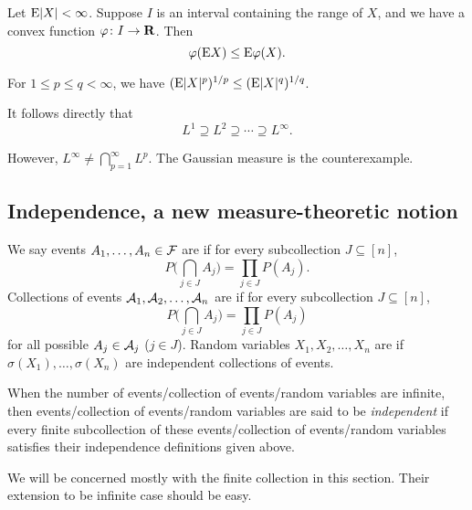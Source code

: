\begin{namedthm} \label{thm:Jensen-prob}
    Let $\mathop{}\!\mathrm{E}\lvert X \rvert <\infty$. Suppose $I$ is an interval containing the range of $X$, and we have a convex function $\varphi\colon I\to \mathbf{R}$. Then \[
        \varphi(\mathop{}\!\mathrm{E} X) \leq \mathop{}\!\mathrm{E} \varphi(X).
    \]
\end{namedthm}
    
\begin{namedthm}
For $1 \leq p \leq q <\infty $, we have $(\mathop{}\!\mathrm{E}\lvert X \rvert^p)^{1/p} \leq (\mathop{}\!\mathrm{E} \lvert X \rvert^q)^{1/q}$.

It follows directly that \[L^1 \supseteq L^2 \supseteq \dotsb \supseteq L^\infty.\]
\end{namedthm}

However, $L^\infty \neq \bigcap_{p=1}^\infty L^p$. The Gaussian measure is the counterexample.

\subsection{Independence, a new measure-theoretic notion}

\begin{defn}
    We say events $A_1,\dotsc,A_n \in \mathcal{F}$ are  if for every subcollection $J \subseteq [n]$, \[
    P\biggl(\bigcap_{j\in J} A_j\biggr) = \prod_{j\in J} P(A_j).
\] %
Collections of events $\mathcal{A}_1,\mathcal{A}_2,\dotsc,\mathcal{A}_n$ are  if for every subcollection $J \subseteq [n]$, \[
    P\biggl(\bigcap_{j \in J} A_j\biggr) = \prod_{j\in J}P(A_j)
\] for all possible $A_j \in \mathcal{A}_j$ ($j \in J$).
Random variables $X_1,X_2,\dotsc,X_n$ are  if $\sigma(X_1),\dotsc,\sigma(X_n)$ are independent collections of events.

When the number of events/collection of events/random variables are infinite, then events/collection of events/random variables are said to be \emph{independent} if every finite subcollection of these events/collection of events/random variables satisfies their independence definitions given above.
\end{defn}

We will be concerned mostly with the finite collection in this section. Their extension to be infinite case should be easy.

